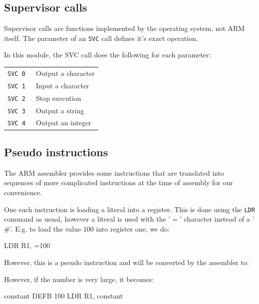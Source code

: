 \documentclass{article}
\begin{document}
\subsection{Supervisor calls}

Supervisor calls are functions implemented by the operating system, not ARM itself. The parameter of an {\tt SVC} call defines it's exact operation.

In this module, the SVC call does the following for each parameter:

\begin{tabularx}{\textwidth}{l X}
	{\tt SVC 0 } & Output a character \\
	{\tt SVC 1 } & Input a character \\
	{\tt SVC 2 } & Stop execution \\
	{\tt SVC 3 } & Output a string \\
	{\tt SVC 4 } & Output an integer \\
\end{tabularx}

\subsection{Pseudo instructions}

The ARM assembler provides some instructions that are translated into sequences of more complicated instructions at the time of assembly for our convenience.

One such instruction is loading a literal into a register. This is done using the {\tt LDR} command as usual, however a literal is used with the '$=$' character instead of a '$\#$'. E.g. to load the value $100$ into register one, we do:

\begin{listing}{1}
	LDR	R1,	=100
\end{listing}

However, this is a pseudo instruction and will be converted by the assembler to:


However, if the number is very large, it becomes:

\begin{listing}{1}
constant	DEFB	100
		LDR	R1, constant
\end{listing}
\end{document}
